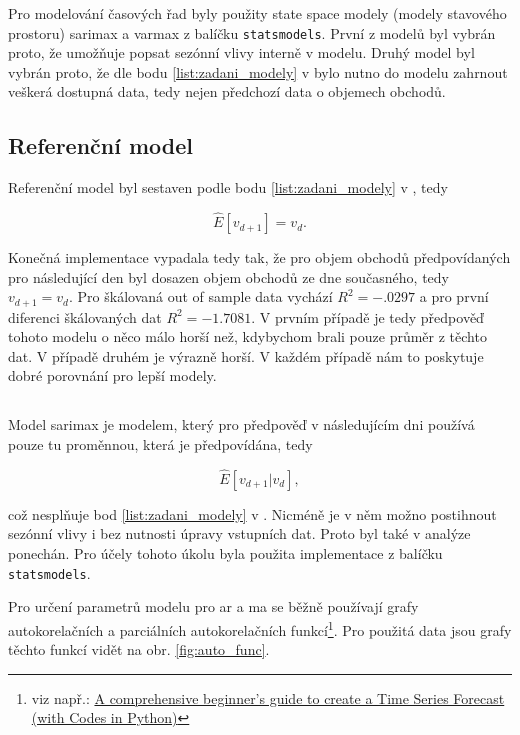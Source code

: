 \documentclass[a4paper,12pt, czech]{article}
\newcommand{\code}[1]{\texttt{#1}}
\begin{document}
Pro modelování časových řad byly použity state space modely (modely stavového prostoru) \gls{sarimax} a \gls{varmax} z balíčku \code{statsmodels}.
První z modelů byl vybrán proto, že umožňuje popsat sezónní vlivy interně v modelu.
Druhý model byl vybrán proto, že dle bodu \ref{list:zadani_modely} v  bylo nutno do modelu zahrnout veškerá dostupná data, tedy nejen předchozí data o objemech obchodů.

\subsection{Referenční model}

Referenční model byl sestaven podle bodu \ref{list:zadani_modely} v , tedy

\begin{equation}\label{eq:reference}
\hat{E}\left[v_{d+1}\right] = v_d.
\end{equation}

Konečná implementace vypadala tedy tak, že pro objem obchodů předpovídaných pro následující den byl dosazen objem obchodů ze dne současného, tedy $v_{d+1} = v_d$.
Pro škálovaná out of sample data vychází $R^2=\num{-.0297}$ a pro první diferenci škálovaných dat $R^2=\num{-1.7081}$.
V prvním případě je tedy předpověď tohoto modelu o něco málo horší než, kdybychom brali pouze průměr z těchto dat.
V případě druhém je výrazně horší.
V každém případě nám to poskytuje dobré porovnání pro lepší modely.

\subsection{} \label{sec:sarimax}

Model \gls{sarimax} je modelem, který pro předpověď v následujícím dni používá pouze tu proměnnou, která je předpovídána, tedy 

\begin{equation}\label{eq:sarimax}
\hat{E}\left[v_{d+1}|v_d\right],
\end{equation}

což nesplňuje bod \ref{list:zadani_modely} v .
Nicméně je v něm možno postihnout sezónní vlivy i bez nutnosti úpravy vstupních dat.
Proto byl také v analýze ponechán.
Pro účely tohoto úkolu byla použita implementace z balíčku \code{statsmodels}.

Pro určení parametrů modelu pro \gls{ar} a \gls{ma} se běžně používají grafy autokorelačních a parciálních autokorelačních funkcí\footnote{viz např.: \href{https://www.analyticsvidhya.com/blog/2016/02/time-series-forecasting-codes-python/}{A comprehensive beginner’s guide to create a Time Series Forecast (with Codes in Python)}}.
Pro použitá data jsou grafy těchto funkcí vidět na obr. \ref{fig:auto_func}.
\end{document}
